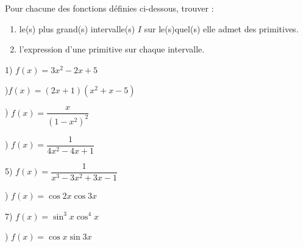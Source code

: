 



 \summary{}
 
\begin{exercice}
Pour chacune des fonctions définies ci-dessous, trouver :
\begin{enumerate}
    \item le(s) plus grand(s) intervalle(s) $I$ sur le(s)quel(s)  elle admet des primitives.
    \item l'expression d'une primitive sur chaque intervalle.
\end{enumerate}

1) $f(x)=3x^2 - 2x + 5$

)$ f(x)= (2x+1)(x^2+x - 5)$ 
 
 ) $f(x) = \dfrac{x}{(1-x^2)^2}$

) $f(x) = \dfrac{1}{4x^2 -4x + 1}$ 
\bigskip

 5) $f(x) = \dfrac{1}{x^3 - 3x^2+3x - 1}$ 
 
 ) $f(x) = \cos 2x\cos 3x$
\bigskip

7) $f(x) = \sin^3 x \cos^4 x $

) $f(x) = \cos x\sin 3x$

\end{exercice}

